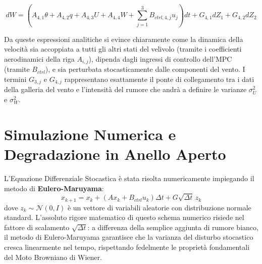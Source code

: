 \documentclass[12pt,a4paper]{article}
\begin{document}
\begin{equation}
    dW = \left( A_{4,1}\theta + A_{4,2}q + A_{4,3}U + A_{4,4}W + \sum_{j=1}^{3} B_{ctrl,4,j} u_j \right) dt + G_{4,1} dZ_1 + G_{4,2} dZ_2
\end{equation}

Da queste espressioni analitiche si evince chiaramente come la dinamica della velocità sia accoppiata a tutti gli altri stati del velivolo (tramite i coefficienti aerodinamici della riga $A_{i,j}$), dipenda dagli ingressi di controllo dell'MPC (tramite $B_{ctrl}$), e sia perturbata stocasticamente dalle componenti del vento. I termini $G_{3,j}$ e $G_{4,j}$ rappresentano esattamente il ponte di collegamento tra i dati della galleria del vento e l'intensità del rumore che andrà a definire le varianze $\sigma_U^2$ e $\sigma_W^2$.

\section{Simulazione Numerica e Degradazione in Anello Aperto}
L'Equazione Differenziale Stocastica è stata risolta numericamente impiegando il metodo di \textbf{Eulero-Maruyama}:
\begin{equation}
    x_{k+1} = x_k + (A x_k + B_{ctrl} u_k) \Delta t + G \sqrt{\Delta t} \, z_k
\end{equation}
dove $z_k \sim \mathcal{N}(0, I)$ è un vettore di variabili aleatorie con distribuzione normale standard. L'assoluto rigore matematico di questo schema numerico risiede nel fattore di scalamento $\sqrt{\Delta t}$: a differenza della semplice aggiunta di rumore bianco, il metodo di Eulero-Maruyama garantisce che la varianza del disturbo stocastico cresca linearmente nel tempo, rispettando fedelmente le proprietà fondamentali del Moto Browniano di Wiener.
\end{document}
